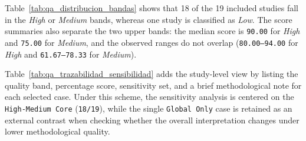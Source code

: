 



Table~\ref{tab:qa_distribucion_bandas} shows that 18 of the 19 included studies fall in the \textit{High} or \textit{Medium} bands, whereas one study is classified as \textit{Low}. The score summaries also separate the two upper bands: the median score is \texttt{90.00} for \textit{High} and \texttt{75.00} for \textit{Medium}, and the observed ranges do not overlap (\texttt{80.00--94.00} for \textit{High} and \texttt{61.67--78.33} for \textit{Medium}).

Table~\ref{tab:qa_trazabilidad_sensibilidad} adds the study-level view by listing the quality band, percentage score, sensitivity set, and a brief methodological note for each selected case. Under this scheme, the sensitivity analysis is centered on the \texttt{High-Medium Core} (\texttt{18/19}), while the single \texttt{Global Only} case is retained as an external contrast when checking whether the overall interpretation changes under lower methodological quality.
